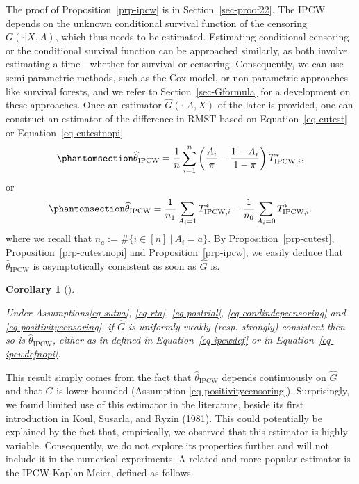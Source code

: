 \documentclass[
  11pt,
  a4paper,
]{article}
\theoremstyle{plain}
\theoremstyle{plain}
\newtheorem{corollary}{Corollary}[section]
\theoremstyle{plain}
\theoremstyle{definition}
\theoremstyle{remark}
\begin{document}
The proof of Proposition~\ref{prp-ipcw} is in Section~\ref{sec-proof22}.
The IPCW depends on the unknown conditional survival function of the
censoring \(G(\cdot|X,A)\), which thus needs to be estimated. Estimating
conditional censoring or the conditional survival function can be
approached similarly, as both involve estimating a time---whether for
survival or censoring. Consequently, we can use semi-parametric methods,
such as the Cox model, or non-parametric approaches like survival
forests, and we refer to Section~\ref{sec-Gformula} for a development on
these approaches. Once an estimator \(\widehat G(\cdot|A,X)\) of the
later is provided, one can construct an estimator of the difference in
RMST based on Equation~\ref{eq-cutest} or Equation~\ref{eq-cutestnopi}
\begin{equation}\phantomsection\label{eq-ipcwdef}{
\widehat\theta_{\mathrm{IPCW}} = \frac1n \sum_{i=1}^n \left(\frac{A_i}{\pi}-\frac{1-A_i}{1-\pi}\right) T^*_{\mathrm{IPCW},i}, 
}\end{equation} or
\begin{equation}\phantomsection\label{eq-ipcwdefnopi}{
\widehat\theta_{\mathrm{IPCW}} = \frac1{n_1}\sum_{A_i = 1}  T^*_{\mathrm{IPCW},i} - \frac1{n_0}\sum_{A_i = 0}  T^*_{\mathrm{IPCW},i}. 
}\end{equation} where we recall that \(n_a := \#\{i \in [n]~|~A_i=a\}\).
By Proposition~\ref{prp-cutest}, Proposition~\ref{prp-cutestnopi} and
Proposition~\ref{prp-ipcw}, we easily deduce that
\(\widehat\theta_{\mathrm{IPCW}}\) is asymptotically consistent as soon
as \(\widehat G\) is.

\begin{corollary}[]\protect\hypertarget{cor-ipcwcons}{}\label{cor-ipcwcons}

Under
Assumptions\ref{eq-sutva}, \ref{eq-rta}, \ref{eq-postrial}, \ref{eq-condindepcensoring}
and \ref{eq-positivitycensoring}, if \(\widehat G\) is uniformly weakly
(resp. strongly) consistent then so is
\(\widehat\theta_{\mathrm{IPCW}}\), either as in defined in
Equation~\ref{eq-ipcwdef} or in Equation~\ref{eq-ipcwdefnopi}.

\end{corollary}

This result simply comes from the fact that
\(\widehat\theta_{\mathrm{IPCW}}\) depends continuously on
\(\widehat G\) and that \(G\) is lower-bounded (Assumption
\ref{eq-positivitycensoring}). Surprisingly, we found limited use of
this estimator in the literature, beside its first introduction in Koul,
Susarla, and Ryzin (1981). This could potentially be explained by the
fact that, empirically, we observed that this estimator is highly
variable. Consequently, we do not explore its properties further and
will not include it in the numerical experiments. A related and more
popular estimator is the IPCW-Kaplan-Meier, defined as follows.
\end{document}
